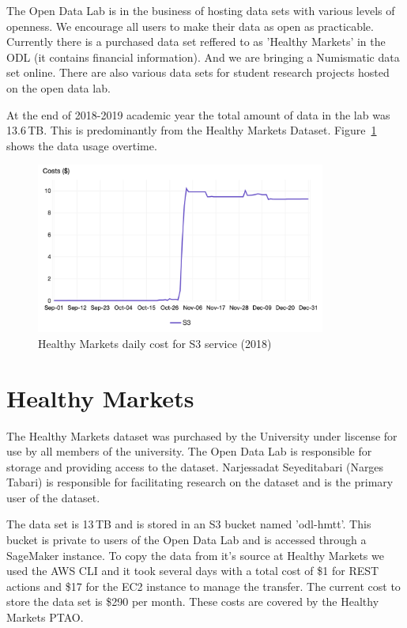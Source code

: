 The Open Data Lab is in the business of hosting data sets with various levels of openness. We encourage all users to make their data as open as practicable. Currently there is a purchased data set reffered to as 'Healthy Markets' in the ODL (it contains financial information). And we are bringing a Numismatic data set online. There are also various data sets for student research  projects hosted on the open data lab.

At the end of 2018-2019 academic year the total amount of data in the lab was  13.6\,TB. This is predominantly from the Healthy Markets Dataset. Figure~\ref{fig:s3cost} shows the data usage overtime.

\begin{figure}[!hbtp]
\includegraphics[width=0.85\textwidth]{images/odl-s3-usage-2018.png}
\caption{Healthy Markets daily cost for S3 service (2018)}
\label{fig:s3cost}
\end{figure}



\section{Healthy Markets}
The Healthy Markets dataset was purchased by the University under liscense for use by  all members of the university. The Open Data Lab is responsible for storage and providing access to the dataset. Narjessadat Seyeditabari (Narges Tabari) is responsible for facilitating research on the dataset and is the primary user of the dataset.

The data set is 13\,TB and is stored in an S3 bucket named 'odl-hmtt'. This bucket is private to users of the Open Data Lab and is accessed through a SageMaker instance. To copy the data from it's source at Healthy Markets we used the AWS CLI and it took several days with a total cost of \$1 for REST actions and \$17 for the EC2 instance to manage the transfer. The current cost to store the data set is \$290 per month. These costs are covered by the Healthy Markets PTAO.

